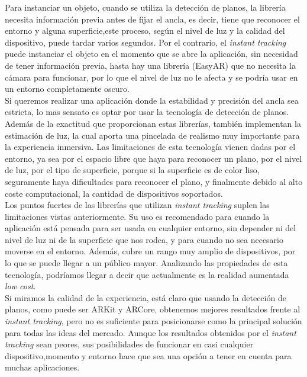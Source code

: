Para instanciar un objeto, cuando se utiliza la detección de planos, la librería necesita información previa antes de fijar el ancla, es decir, tiene que reconocer el entorno y alguna superficie,este proceso, según el nivel de luz y la calidad del dispositivo, puede tardar varios segundos. Por el contrario, el \textit{instant tracking} puede instanciar el objeto en el momento que se abre la aplicación, sin necesidad de tener información previa, hasta hay una librería (EasyAR) que no necesita la cámara para funcionar, por lo que el nivel de luz no le afecta y se podría usar en un entorno completamente oscuro.\\

Si queremos realizar una aplicación donde la estabilidad y precisión del ancla sea estricta, lo mas sensato es optar por usar la tecnología de detección de planos. Además de la exactitud que proporcionan estas librerías, también implementan la estimación de luz, la cual aporta una pincelada de realismo muy importante para la experiencia inmersiva. Las limitaciones de esta tecnología vienen dadas por el entorno, ya sea por el espacio libre que haya para reconocer un plano, por el nivel de luz, por el tipo de superficie, porque si la superficie es de color liso, seguramente haya dificultades para reconocer el plano, y finalmente debido al alto coste computacional, la cantidad de dispositivos soportados.\\

Los puntos fuertes de las librerías que utilizan \textit{instant tracking} suplen las limitaciones vistas anteriormente. Su uso es recomendado para cuando la aplicación está pensada para ser usada en cualquier entorno, sin depender ni del nivel de luz ni de la superficie que nos rodea, y para cuando no sea necesario moverse en el entorno. Además, cubre un rango muy amplio de dispositivos\cite{wikitudeInstant}, por lo que se puede llegar a un público mayor. Analizando las propiedades de esta tecnología, podríamos llegar a decir que actualmente es la realidad aumentada \textit{low cost}. \\

Si miramos la calidad de la experiencia, está claro que usando la detección de planos, como puede ser ARKit y ARCore, obtenemos mejores resultados frente al \textit{instant tracking}, pero no es suficiente para posicionarse como la principal solución para todas las ideas del mercado. Aunque los resultados obtenidos por el \textit{instant tracking} sean peores, sus posibilidades de funcionar en casi cualquier dispositivo,momento y entorno hace que sea una opción a tener en cuenta para muchas aplicaciones.



















\noindent